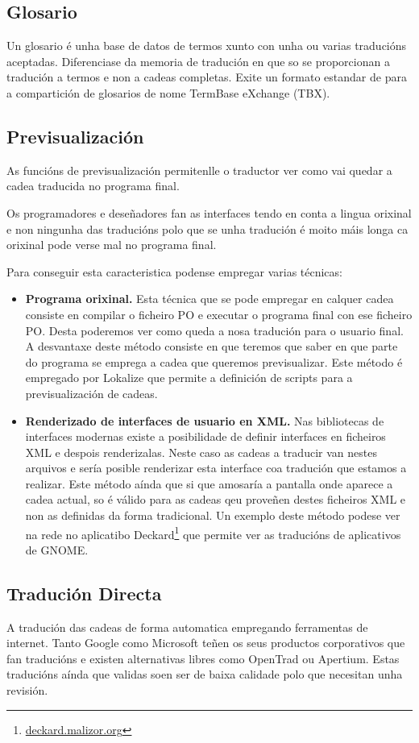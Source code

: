 \subsection{Glosario}
Un glosario é unha base de datos de termos xunto con unha ou varias traducións aceptadas. Diferenciase da memoria de tradución en que so se proporcionan a tradución a termos e non a cadeas completas. Exite un formato estandar de para a compartición de glosarios de nome TermBase eXchange (TBX).


\subsection{Previsualización}
As funcións de previsualización permitenlle o traductor ver como vai quedar a cadea traducida no programa final. 

Os programadores e deseñadores fan as interfaces tendo en conta a lingua orixinal e non ningunha das traducións polo que se unha tradución é moito máis longa ca orixinal pode verse mal no programa final.

Para conseguir esta caracteristica podense empregar varias técnicas:

\begin{itemize}
  \item \textbf{Programa orixinal.} Esta técnica que se pode empregar en calquer cadea consiste en compilar o ficheiro PO e executar o programa final con ese ficheiro PO. Desta poderemos ver como queda a nosa tradución para o usuario final. A desvantaxe deste método consiste en que teremos que saber en que parte do programa se emprega a cadea que queremos previsualizar. Este método é empregado por Lokalize que permite a definición de scripts para a previsualización de cadeas.

  \item \textbf{Renderizado de interfaces de usuario en XML.} Nas bibliotecas de interfaces modernas existe a posibilidade de definir interfaces en ficheiros XML e despois renderizalas. Neste caso as cadeas a traducir van nestes arquivos e sería posible renderizar esta interface coa tradución que estamos a realizar. Este método aínda que si que amosaría a pantalla onde aparece a cadea actual, so é válido para as cadeas qeu proveñen destes ficheiros XML e non as definidas da forma tradicional. Un exemplo deste método podese ver na rede no aplicatibo Deckard\footnote{\href{http://deckard.malizor.org/}{deckard.malizor.org}} que permite ver as traducións de aplicativos de GNOME.
\end{itemize}


\subsection{Tradución Directa}
A tradución das cadeas de forma automatica empregando ferramentas de internet. Tanto Google como Microsoft teñen os seus productos corporativos que fan traducións e existen alternativas libres como OpenTrad ou Apertium. Estas traducións aínda que validas soen ser de baixa calidade polo que necesitan unha revisión.
